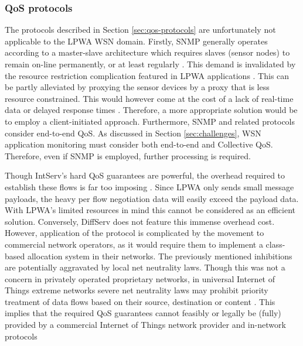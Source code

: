 \subsubsection{QoS protocols}
The protocols described in Section \ref{sec:qos-protocols} are unfortunately not applicable to the LPWA WSN domain. Firstly, SNMP generally operates according to a master-slave architecture \cite{snmp_server_initiated} which requires slaves (sensor nodes) to remain on-line permanently, or at least regularly \cite{snmp_architecture}. This demand is invalidated by the resource restriction complication featured in LPWA applications \cite{key_features}. This can be partly alleviated by proxying the sensor devices by a proxy that is less resource constrained. This would however come at the cost of a lack of real-time data or delayed response times \cite{snmp_proxy}. Therefore, a more appropriate solution would be to employ a client-initiated approach. Furthermore, SNMP and related protocols consider end-to-end QoS. As discussed in Section \ref{sec:challenges}, WSN application monitoring must consider both end-to-end and Collective QoS. Therefore, even if SNMP is employed, further processing is required.

Though IntServ's hard QoS guarantees are powerful, the overhead required to establish these flows is far too imposing \cite{intserv_diffserv_too_complex, qos_challenges}. Since LPWA only sends small message payloads, the heavy per flow negotiation data will easily exceed the payload data. With LPWA's limited resources in mind this cannot be considered as an efficient solution. Conversely, DiffServ does not feature this immense overhead cost. However, application of the protocol is complicated by the movement to commercial network operators, as it would require them to implement a class-based allocation system in their networks. The previously mentioned inhibitions are potentially aggravated by local net neutrality laws. Though this was not a concern in privately operated proprietary networks, in universal Internet of Things extreme networks severe net neutrality laws may prohibit priority treatment of data flows based on their source, destination or content \cite{net_neutrality}. This implies that the required QoS guarantees cannot feasibly or legally be (fully) provided by a commercial Internet of Things network provider and in-network protocols

